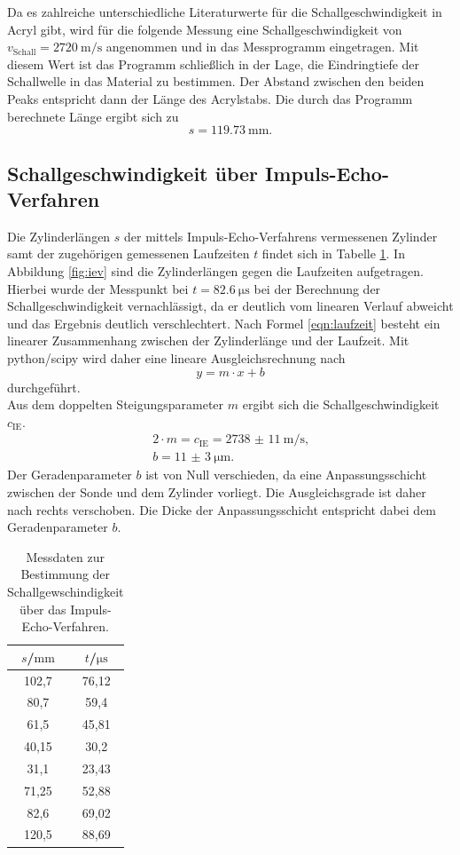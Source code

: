 Da es zahlreiche unterschiedliche Literaturwerte für die Schallgeschwindigkeit in Acryl gibt, wird für die folgende Messung eine Schallgeschwindigkeit von $v_{\mathrm{Schall}}=\SI{2720}{\meter\per\second}$ angenommen und in das Messprogramm eingetragen.
Mit diesem Wert ist das Programm schließlich in der Lage, die Eindringtiefe der Schallwelle in das Material zu bestimmen.
Der Abstand zwischen den beiden Peaks entspricht dann der Länge des Acrylstabs.
Die durch das Programm berechnete Länge ergibt sich zu
\begin{equation}
  s=\SI{119.73}{\milli\meter} \text{.}
\end{equation}
\FloatBarrier

\subsection{Schallgeschwindigkeit über Impuls-Echo-Verfahren}
Die Zylinderlängen $s$ der mittels Impuls-Echo-Verfahrens vermessenen Zylinder samt der zugehörigen gemessenen Laufzeiten $t$ findet sich in Tabelle \ref{tab:iev}. In Abbildung \ref{fig:iev} sind die Zylinderlängen gegen die Laufzeiten aufgetragen.
Hierbei wurde der Messpunkt bei $t=\SI{82.6}{\micro\second}$ bei der Berechnung der Schallgeschwindigkeit vernachlässigt, da er deutlich vom linearen Verlauf abweicht und das Ergebnis deutlich verschlechtert.
Nach Formel \eqref{eqn:laufzeit} besteht ein linearer Zusammenhang zwischen der Zylinderlänge und der Laufzeit.
Mit python/scipy \cite{scipy} wird daher eine lineare Ausgleichsrechnung nach
\begin{equation}
  y=m\cdot x +b
\end{equation}
durchgeführt.\\
Aus dem doppelten Steigungsparameter $m$ ergibt sich die Schallgeschwindigkeit $c_\mathrm{IE}$.
\begin{gather*}
2 \cdot m=c_\mathrm{IE}=  \SI{2738(11)}{\meter\per\second} \text{,}\\
b=  \SI{11(3)}{\micro\meter} \text{.}
\end{gather*}
Der Geradenparameter $b$ ist von Null verschieden, da eine Anpassungsschicht zwischen der Sonde und dem Zylinder vorliegt. Die Ausgleichsgrade ist daher nach rechts verschoben. Die Dicke der Anpassungsschicht entspricht dabei dem Geradenparameter $b$.
\begin{table}
  \centering
  \caption{Messdaten zur Bestimmung der Schallgewschindigkeit über das Impuls-Echo-Verfahren.}
  \label{tab:iev}
  \begin{tabular}{cc}
    \toprule
    $s$/$\si{\milli\meter}$ & $t$/$\si{\micro\second}$ \\
    \midrule
    102,7 & 76,12 \\
    80,7 & 59,4 \\
    61,5 & 45,81 \\
    40,15 & 30,2 \\
    31,1 & 23,43 \\
    71,25 & 52,88 \\
    82,6 & 69,02 \\
    120,5 & 88,69 \\
    \bottomrule
  \end{tabular}
\end{table}

